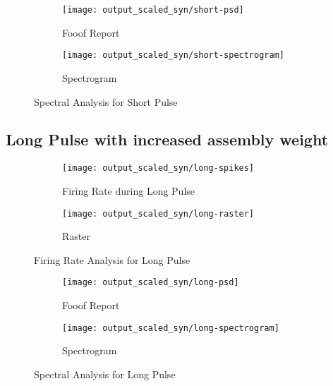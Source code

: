 \documentclass[12pt, letterpaper]{article}
\begin{document}
\begin{figure}[H]
    \centering
    \begin{subfigure}{.75\textwidth}
      \centering
      \texttt{[image: output\_scaled\_syn/short-psd]}
      \caption{Fooof Report}
      \label{fig:short-psd}
    \end{subfigure}
    \begin{subfigure}{.75\textwidth}
      \centering
      \texttt{[image: output\_scaled\_syn/short-spectrogram]}
      \caption{Spectrogram}
      \label{fig:short-spectrogram}
    \end{subfigure}
    \caption{Spectral Analysis for Short Pulse}
\end{figure}

\subsection*{Long Pulse with increased assembly weight}

\begin{figure}[H]
  \centering
  \begin{subfigure}{\textwidth}
    \centering
    \texttt{[image: output\_scaled\_syn/long-spikes]}
    \caption{Firing Rate during Long Pulse}
    \label{fig:long-spikes}
  \end{subfigure}
  \begin{subfigure}{\textwidth}
    \centering
    \texttt{[image: output\_scaled\_syn/long-raster]}
    \caption{Raster}
    \label{fig:long-raster}
  \end{subfigure}
  \caption{Firing Rate Analysis for Long Pulse}
\end{figure}

\begin{figure}[H]
    \centering
    \begin{subfigure}{.75\textwidth}
      \centering
      \texttt{[image: output\_scaled\_syn/long-psd]}
      \caption{Fooof Report}
      \label{fig:long-psd}
    \end{subfigure}
    \begin{subfigure}{.75\textwidth}
      \centering
      \texttt{[image: output\_scaled\_syn/long-spectrogram]}
      \caption{Spectrogram}
      \label{fig:long-spectrogram}
    \end{subfigure}
    \caption{Spectral Analysis for Long Pulse}
\end{figure}


\end{document}
